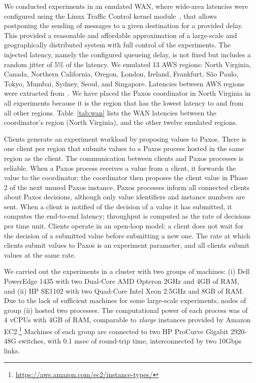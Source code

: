 We conducted experiments in an emulated WAN, where wide-area latencies were
configured using the Linux Traffic Control kernel module~\cite{ltc}, that
allows postponing the sending of messages to a given destination for a provided
delay.
%
This provided a reasonable and affordable approximation of a large-scale and geographically distributed system with full control of the experiments.
The injected latency, namely the configured queueing delay, is not fixed but
includes a random jitter of 5\% of the latency.
%
We emulated 13 AWS regions:
North Virginia, Canada, Northern California, Oregon, London, Ireland,
Frankfurt, S\~{a}o Paulo, Tokyo, Mumbai, Sydney, Seoul, and Singapore.
Latencies between AWS regions were extracted from~\cite{crain18}.
%
We have placed the Paxos coordinator in North Virginia in all experiments
because it is the region that has the lowest latency to and from all other
regions.
Table~\ref{tab:wan} lists the WAN latencies between the coordinator's region
(North Virginia), and the other twelve emulated regions.

Clients generate an experiment workload by proposing values to Paxos.
There is one client per region that submits values to a Paxos process hosted
in the same region as the client.
The communication between clients and Paxos processes is reliable.
%
When a Paxos process receives a value from a client, it forwards the value to
the coordinator; the coordinator then proposes the client value in Phase 2 of
the next unused Paxos instance.
%
Paxos processes inform all connected clients about Paxos decisions, although
only value identifiers and instance numbers are sent.
%
When a client is notified of the decision of a value it has submitted, it
computes the end-to-end latency; throughput is computed as the rate of
decisions per time unit.
%
Clients operate in an open-loop model: a client does not wait for the decision
of a submitted value before submitting a new one.
The rate at which clients submit values to Paxos is an experiment parameter,
and all clients submit values at the same rate.

We carried out the experiments in a cluster with two groups of machines: (i)
Dell PowerEdge 1435 with two Dual-Core AMD Opteron 2GHz and 4GB of RAM, and
(ii) HP SE1102 with two Quad-Core Intel Xeon 2.5GHz and 8GB of RAM.
Due to the lack of sufficient machines for some large-scale experiments, nodes
of group (ii) hosted two processes.
The computational power of each process was of 4 vCPUs with 4GB of RAM,
comparable to {\em xlarge} instances provided by Amazon
EC2.\footnote{\url{https://aws.amazon.com/ec2/instance-types/}}
Machines of each group are connected to two HP ProCurve Gigabit 2920-48G
switches, with 0.1 msec of round-trip time, interconnected by two 10Gbps links.

